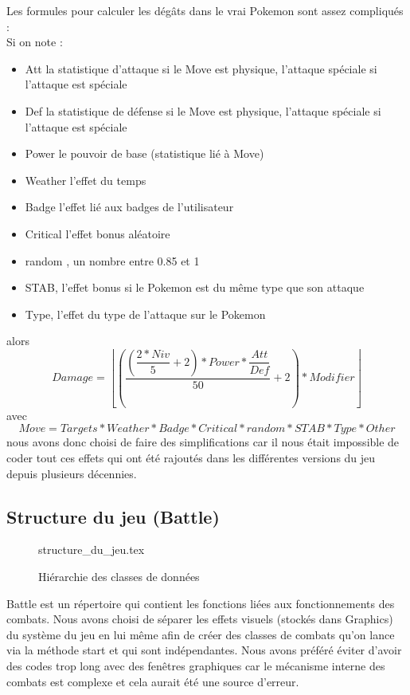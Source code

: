 \documentclass[a4paper,twoside, openany,11pt]{book}
\newcommand{\Floor}[1]{\left\lfloor #1 \right\rfloor}
\begin{document}
Les formules pour calculer les dégâts dans le vrai Pokemon sont assez compliqués :\\
Si on note :
\begin{itemize}
\item Att la statistique d'attaque si le Move est physique, l'attaque spéciale si l'attaque est spéciale
\item Def la statistique de défense si le Move est physique, l'attaque spéciale si l'attaque est spéciale
\item Power le pouvoir de base (statistique lié à Move)
\item Weather l'effet du temps
\item Badge l'effet lié aux badges de l'utilisateur
\item Critical l'effet bonus aléatoire 
\item random , un nombre entre 0.85 et 1
\item STAB, l'effet bonus si le Pokemon est du même type que son attaque
\item Type, l'effet du type de l'attaque sur le Pokemon
\end{itemize}
alors 
\[
Damage = \Floor{\left(\dfrac{\left(\dfrac{2 * Niv}{5} + 2\right) * Power * \dfrac{Att}{Def}}{50} + 2 \right) * Modifier}
\]
avec
\[
Move = Targets * Weather * Badge * Critical * random * STAB * Type * Other
\]
nous avons donc choisi de faire des simplifications car il nous était impossible de coder tout ces effets qui ont été rajoutés dans les différentes versions du jeu depuis plusieurs décennies.
\newpage

\subsection{Structure du jeu (Battle)}

\begin{figure}[!h]\centering
{structure_du_jeu.tex}
\caption{Hiérarchie des classes de données}
\end{figure}

Battle est un répertoire qui contient les fonctions liées aux fonctionnements des combats. Nous avons choisi de séparer les effets visuels (stockés dans Graphics) du système du jeu en lui même afin de créer des classes de combats qu'on lance via la méthode start et qui sont indépendantes. Nous avons préféré éviter d'avoir des codes trop long avec des fenêtres graphiques car le mécanisme interne des combats est complexe et cela aurait été une source d'erreur.
\end{document}
